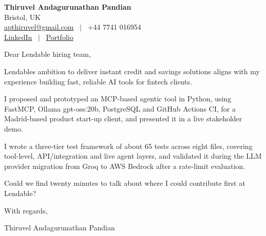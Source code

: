 \documentclass[11pt,a4paper]{article}
\begin{document}
\raggedright
\pagestyle{empty}

\begin{center}
    {\LARGE \color{linkblue} \textbf{Thiruvel Andagurunathan Pandian}}\\[0.2cm]
    Bristol, UK \\
    \href{mailto:apthiruvel@gmail.com}{apthiruvel@gmail.com} \ $|$ \ +44 7741 016954 \\
\href{https://www.linkedin.com/in/thiruvel-a-p/}{LinkedIn} \ $|$ \ \href{https://thiruvel-ap.github.io/PersonalPortfolio/}{Portfolio}
\end{center}

\vspace{0.4cm}

\noindent
Dear Lendable hiring team,

Lendable\textquotesingle{}s ambition to deliver instant credit and savings solutions aligns with my experience building fast, reliable AI tools for fintech clients.

I proposed and prototyped an MCP-based agentic tool in Python, using FastMCP, Ollama gpt-oss:20b, PostgreSQL and GitHub Actions CI, for a Madrid-based product start-up client, and presented it in a live stakeholder demo.

I wrote a three-tier test framework of about 65 tests across eight files, covering tool-level, API/integration and live agent layers, and validated it during the LLM provider migration from Groq to AWS Bedrock after a rate-limit evaluation.

Could we find twenty minutes to talk about where I could contribute first at Lendable?

\vspace{0.5cm}

With regards,

Thiruvel Andagurunathan Pandian
\end{document}

